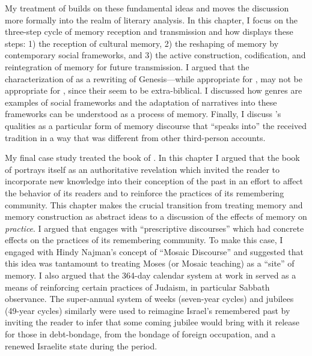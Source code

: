 My treatment of \ga builds on these fundamental ideas and moves the discussion more formally into the realm of literary analysis. In this chapter, I focus on the three-step cycle of memory reception and transmission and how \ga displays these steps: 1) the reception of cultural memory, 2) the reshaping of memory by contemporary social frameworks, and 3) the active construction, codification, and reintegration of memory for future transmission. I argued that the characterization of \ga as a rewriting of Genesis---while appropriate for , may not be appropriate for , since their \vorlagen seem to be extra-biblical. I discussed how genres are examples of social frameworks and the adaptation of \ga narratives into these frameworks can be understood as a process of memory. Finally, I discuss \ga's \psgraphical qualities as a particular form of memory discourse that ``speaks into'' the received tradition in a way that was different from other third-person accounts.

My final case study treated the book of \jub. In this chapter I argued that the book of \jub portrays itself as an authoritative revelation which invited the reader to incorporate new knowledge into their conception of the past in an effort to affect the behavior of its readers and to reinforce the practices of its remembering community. This chapter makes the crucial transition from treating memory and memory construction as abstract ideas to a discussion of the effects of memory on \emph{practice}. I argued that \jub engages with ``prescriptive discourses'' which had concrete effects on the practices of its remembering community. To make this case, I engaged with Hindy Najman's concept of ``Mosaic Discourse'' and suggested that this idea was tantamount to treating Moses (or Mosaic teaching) as a ``site'' of memory. I also argued that the 364-day calendar system at work in \jub served as a means of reinforcing certain practices of \secondtemple Judaism, in particular Sabbath observance. The super-annual system of weeks (seven-year cycles) and jubilees (49-year cycles) similarly were used to reimagine Israel's remembered past by inviting the reader to infer that some coming jubilee would bring with it release for those in debt-bondage, from the bondage of foreign occupation, and a renewed Israelite state during the \secondtemple period.



